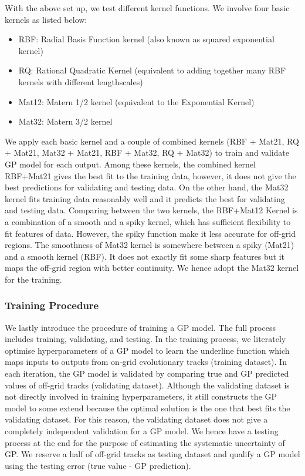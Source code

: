 With the above set up, we test different kernel functions. We involve four basic kernels as listed below:
\begin{itemize}
\item RBF: Radial Basis Function kernel (also known as squared exponential kernel)
\item RQ: Rational Quadratic Kernel (equivalent to adding together many RBF kernels with different lengthscales)
\item Mat12: Matern 1/2 kernel (equivalent to the Exponential Kernel)
\item Mat32: Matern 3/2 kernel 
\end{itemize}
We apply each basic kernel and a couple of combined kernels (RBF + Mat21, RQ + Mat21, Mat32 + Mat21, RBF + Mat32, RQ + Mat32) to train and validate GP model for each output. Among these kernels, the combined kernel RBF+Mat21 gives the best fit to the training data, however, it does not give the best predictions for validating and testing data. On the other hand, the Mat32 kernel fits training data reasonably well and it predicts the best for validating and testing data. 
%
Comparing between the two kernels, the RBF+Mat12 Kernel is a combination of a smooth and a spiky kernel, which has sufficient flexibility to fit features of data. However, the spiky function make it less accurate for off-grid regions. 
%
The smoothness of Mat32 kernel is somewhere between a spiky (Mat21) and a smooth kernel (RBF). It does not exactly fit some sharp features but it maps the off-grid region with better continuity. We hence adopt the Mat32 kernel for the training. 

\subsubsection{Training Procedure}

We lastly introduce the procedure of training a GP model. The full process includes training, validating, and testing. 
In the training process, we literately optimise hyperparameters of a GP model to learn the underline function which maps inputs to outputs from on-grid evolutionary tracks (training dataset). In each iteration, the GP model is validated by comparing true and GP predicted values of off-grid tracks (validating dataset). Although the validating dataset is not directly involved in training hyperparameters, it still constructs the GP model to some extend because the optimal solution is the one that best fits the validating dataset. For this reason, the validating dataset does not give a completely independent validation for a GP model. 
%
We hence have a testing process at the end for the purpose of estimating the systematic uncertainty of GP. We reserve a half of off-grid tracks as testing dataset and qualify a GP model using the testing error (true value - GP prediction).


